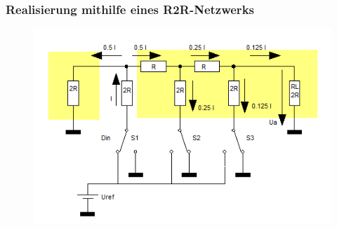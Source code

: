 \subsubsection{Realisierung mithilfe eines R2R-Netzwerks}

\begin{figure}[h!]
\centering
\includegraphics[scale=0.6]{images/r2r.png}
\label{r2r}
\end{figure}

